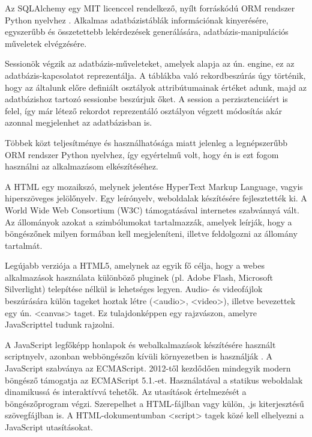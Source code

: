 
Az SQLAlchemy egy MIT licenccel rendelkező, nyílt forráskódú ORM rendszer Python nyelvhez \cite{sqlalchemy}. Alkalmas adatbázistáblák információnak kinyerésére, egyszerűbb és összetettebb lekérdezések generálására, adatbázis-manipulációs műveletek elvégzésére.

Sessionök végzik az adatbázis-műveleteket, amelyek alapja az ún. engine, ez az adatbázis-kapcsolatot reprezentálja. A táblákba való rekordbeszúrás úgy történik, hogy az általunk előre definiált osztályok attribútumainak értéket adunk, majd az adatbázishoz tartozó sessionbe beszúrjuk őket. A session a perzisztenciáért is felel, így már létező rekordot reprezentáló osztályon végzett módosítás akár azonnal megjelenhet az adatbázisban is.

Többek közt teljesítménye és használhatósága miatt jelenleg a legnépszerűbb ORM rendszer Python nyelvhez, így egyértelmű volt, hogy én is ezt fogom használni az alkalmazásom elkészítéséhez. 


A HTML egy mozaikszó, melynek jelentése HyperText Markup Language, vagyis hiperszöveges jelölőnyelv. Egy leírónyelv, weboldalak készítésére fejlesztették ki. A World Wide Web Consortium (W3C) támogatásával internetes szabvánnyá vált. Az állományok azokat a szimbólumokat tartalmazzák, amelyek leírják, hogy a böngészőnek milyen formában kell megjeleníteni, illetve feldolgozni az állomány tartalmát.

Legújabb verziója a HTML5, amelynek az egyik fő célja, hogy a webes alkalmazások használata különböző pluginek (pl. Adobe Flash, Microsoft Silverlight) telepítése nélkül is lehetséges legyen. Audio- és videofájlok beszúrására külön tageket hoztak létre (<audio>, <video>), illetve bevezettek egy ún. <canvas> taget. Ez tulajdonképpen egy rajzvászon, amelyre JavaScripttel tudunk rajzolni.


A JavaScript legfőképp honlapok és webalkalmazások készítésére használt scriptnyelv, azonban webböngészőn kívüli környezetben is használják \cite{javascript}. A JavaScript szabványa az ECMAScript. 2012-től kezdődően mindegyik modern böngésző támogatja az ECMAScript 5.1.-et. Használatával a statikus weboldalak dinamikussá és interaktívvá tehetők. Az utasítások értelmezését a böngészőprogram végzi. Szerepelhet a HTML-fájlban vagy külön, .js kiterjesztésű szövegfájlban is. A HTML-dokumentumban <script> tagek közé kell elhelyezni a JavaScript utasításokat.

